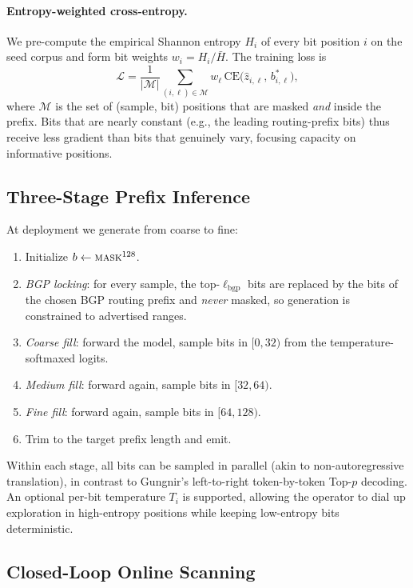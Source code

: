 \documentclass[conference]{IEEEtran}
\begin{document}
\paragraph{Entropy-weighted cross-entropy.}  We pre-compute the
empirical Shannon entropy $H_i$ of every bit position $i$ on the seed
corpus and form bit weights $w_i = H_i/\bar H$.  The training loss is
\begin{equation}
\mathcal L
 = \frac{1}{|\mathcal M|}\sum_{(i,\ell)\in\mathcal M}
   w_\ell\,\mathrm{CE}\bigl(\hat z_{i,\ell},\,b^{*}_{i,\ell}\bigr),
\end{equation}
where $\mathcal M$ is the set of (sample, bit) positions that are
masked \emph{and} inside the prefix.  Bits that are nearly constant
(e.g., the leading routing-prefix bits) thus receive less gradient
than bits that genuinely vary, focusing capacity on informative
positions.

\subsection{Three-Stage Prefix Inference}\label{sec:design-infer}
At deployment we generate from coarse to fine:

\begin{enumerate}
\item Initialize $b\leftarrow\textsc{mask}^{128}$.
\item \emph{BGP locking}: for every sample, the top-$\ell_{\mathrm{bgp}}$
      bits are replaced by the bits of the chosen BGP routing prefix and
      \emph{never} masked, so generation is constrained to advertised
      ranges.
\item \emph{Coarse fill}: forward the model, sample bits in $[0,32)$
      from the temperature-softmaxed logits.
\item \emph{Medium fill}: forward again, sample bits in $[32,64)$.
\item \emph{Fine fill}: forward again, sample bits in $[64,128)$.
\item Trim to the target prefix length and emit.
\end{enumerate}

Within each stage, all bits can be sampled in parallel (akin to
non-autoregressive translation), in contrast to Gungnir's
left-to-right token-by-token Top-$p$ decoding.  An optional per-bit
temperature $T_{i}$ is supported, allowing the operator to dial up
exploration in high-entropy positions while keeping low-entropy bits
deterministic.

\subsection{Closed-Loop Online Scanning}\label{sec:design-online}
\end{document}
